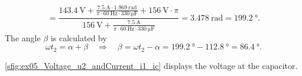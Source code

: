 \begin{solutionblock}
\begin{equation}
                             =\frac{\SI{143.4}{\volt} +\frac{\SI{7.5}{\ampere} \cdot \SI{1.969}{\radian}}{\pi \cdot \SI{60}{\hertz} \cdot \SI{330}{\micro\farad}} + \SI{156}{\volt} \cdot \pi}
                             {\SI{156}{\volt} + \frac{\SI{7.5}{\ampere} }{\pi \cdot \SI{60}{\hertz} \cdot \SI{330}{\micro\farad}}}=\SI{3.478}{\radian}=\SI{199.2}{\degree}.
    \end{equation}
    The angle $\beta$ is calculated by
    \begin{equation}
        \omega t_\mathrm{2} = \alpha + \beta \quad \Rightarrow \quad \beta = \omega t_\mathrm{2} - \alpha = 
        \SI{199.2}{\degree} - \SI{112.8}{\degree} = \SI{86.4}{\degree}.
    \end{equation}
\end{solutionblock}

\vspace{2em}\par

\begin{solutionblock}
    \autoref{sfig:ex05_Voltage_u2_andCurrent_i1_ic} displays the voltage at the capacitor.
      
\end{solutionblock}

